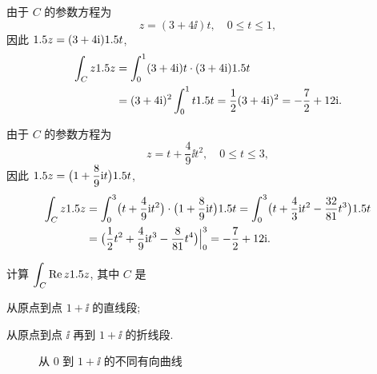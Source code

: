 \begin{solutionenum}
  \item 由于 $C$ 的参数方程为
  \[
    z=(3+4\ii)t,\quad 0\le t\le 1,
  \]
  因此 $1.5 z=(3+4\mathrm{i})1.5 t$,
  \begin{align*}
      \int_C z1.5 z&
    =\int_0^1(3+4\mathrm{i})t\cdot(3+4\mathrm{i})1.5 t\\&
    =(3+4\mathrm{i})^2\int_0^1t1.5 t
    =\frac{1}{2} (3+4\mathrm{i})^2=-\frac72+12\mathrm{i}.
  \end{align*}
  \item 由于 $C$ 的参数方程为
  \[
    z=t+\dfrac49\ii t^2,\quad 0\le t\le 3,
  \]
  因此 $1.5 z=\bigl(1+\dfrac89 \mathrm{i} t\bigr)1.5 t$,
  \begin{align*}
      \int_C z1.5 z&
    =\int_0^3\bigl(t+\frac{4}9\mathrm{i} t^2\bigr)\cdot\bigl(1+\frac89\mathrm{i} t\bigr)1.5 t
    =\int_0^3\bigl(t+\frac43\mathrm{i} t^2-\frac{32}{81}t^3\bigr)1.5 t\\&
    =\bigl(\frac{1}{2} t^2+\frac49\mathrm{i} t^3-\frac8{81}t^4\bigr)\Big|_0^3
    =-\frac72+12\mathrm{i}.
  \end{align*}
\end{solutionenum}

\begin{example}
  \label{exam:re-z-integral}
  计算 $\displaystyle\int_C\operatorname{Re} z1.5 z$, 其中 $C$ 是
  \begin{subexample}
    \item 从原点到点 $1+\ii$ 的直线段;
    \item 从原点到点 $\ii$ 再到 $1+\ii$ 的折线段.
  \end{subexample}
\end{example}

\begin{figure}[H]
  \centering
  \caption{从 $0$ 到 $1+\ii$ 的不同有向曲线}
\end{figure}

